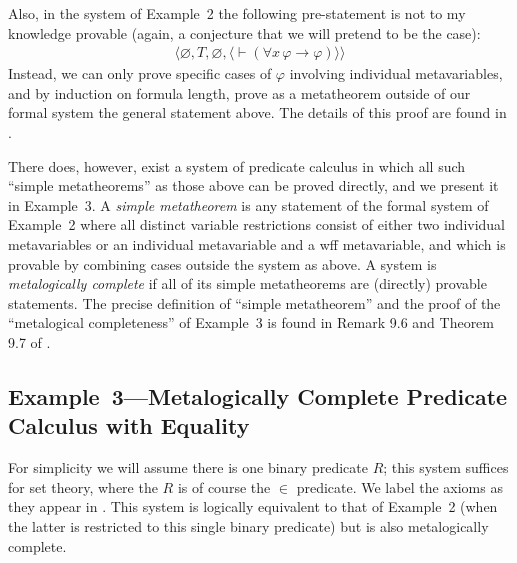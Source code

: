 Also, in the system of Example~2 the following pre-statement is not to my
knowledge provable (again, a conjecture that we will pretend to be the case):
\begin{eqnarray*}
     & \langle\varnothing,T,\varnothing,
               \langle \vdash(\forall x\, \varphi\to\varphi)
               \rangle\rangle &
\end{eqnarray*}
Instead, we can only prove specific cases of $\varphi$ involving individual
metavariables, and by induction on formula length, prove as a metatheorem
outside of our formal system the general statement above.  The details of this
proof are found in \cite{Kalish}.

There does, however, exist a system of predicate calculus in which all such
``simple metatheorems'' as those above can be proved directly, and we present
it in Example~3. A {\em simple metatheorem}
is any statement of the formal
system of Example~2 where all distinct variable restrictions consist of either
two individual metavariables or an individual metavariable and a wff
metavariable, and which is provable by combining cases outside the system as
above.  A system is {\em metalogically complete} if all of its simple
metatheorems are (directly) provable statements. The precise definition of
``simple metatheorem'' and the proof of the ``metalogical completeness'' of
Example~3 is found in Remark 9.6 and Theorem 9.7 of \cite{Megill}.

\subsection{Example~3---Metalogically Complete Predicate
Calculus with
Equality}

For simplicity we will assume there is one binary predicate $R$;
this system suffices for set theory, where the $R$ is of course the $\in$
predicate.  We label the axioms as they appear in \cite{Megill}.  This
system is logically equivalent to that of Example~2 (when the latter is
restricted to this single binary predicate) but is also metalogically
complete.

